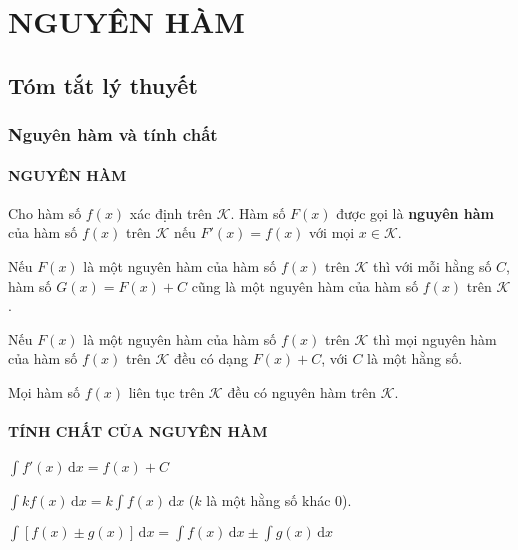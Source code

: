 \section{NGUYÊN HÀM}
\subsection{Tóm tắt lý thuyết}
\subsubsection{Nguyên hàm và tính chất}
\paragraph{NGUYÊN HÀM}
	\begin{dn}
	Cho hàm số $f(x)$ xác định trên $\mathscr{K}$. Hàm số $F(x)$ được gọi là \textbf{nguyên hàm} của hàm số $f(x)$ trên $\mathscr{K}$ nếu $F'(x) = f(x)$ với mọi $x \in \mathscr{K}$.
	\end{dn}
	\begin{dl}
		Nếu $F(x)$ là một nguyên hàm của hàm số $f(x)$ trên $\mathscr{K}$ thì với mỗi hằng số $C$, hàm số $G(x) = F(x) + C$ cũng là một nguyên hàm của hàm số $f(x)$ trên $\mathcal{K}$.
	\end{dl}
	\begin{dl}
		Nếu $F(x)$ là một nguyên hàm của hàm số $f(x)$ trên $\mathscr{K}$ thì mọi nguyên hàm của hàm số $f(x)$ trên $\mathscr{K}$ đều có dạng $F(x) + C$, với $C$ là một hằng số.
	\end{dl}
	\begin{dl}
		Mọi hàm số $f(x)$ liên tục trên $\mathscr{K}$ đều có nguyên hàm trên $\mathcal{K}$.
	\end{dl}
\paragraph{TÍNH CHẤT CỦA NGUYÊN HÀM}
	\begin{tc} $\displaystyle \int{f'(x)} \mathrm{\,d}x = f(x) + C$ \end{tc}
	\begin{tc} $\displaystyle \int{kf(x)} \mathrm{\,d}x = k \displaystyle \int{f(x)} \displaystyle \mathrm{\,d}x $ ($k$ là một hằng số khác $0$). \end{tc}
	\begin{tc} $\displaystyle \int{ \left[ f(x) \pm g(x) \right]} \mathrm{\,d}x =\displaystyle \int{f(x)} \mathrm{\,d}x \pm \displaystyle \int{g(x)} \mathrm{\,d}x$ \end{tc}

